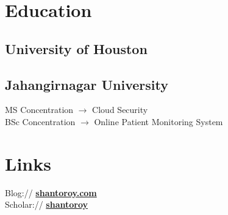 \documentclass[letterpaper,dvipsnames]{deedy-resume} %
\begin{document}
\begin{minipage}[t]{0.33\textwidth} %


\section{Education} 

\subsection{University of Houston}


\sectionspace %

\subsection{Jahangirnagar University}
MS Concentration $\rightarrow$ Cloud Security \\
BSc Concentration $\rightarrow$ Online Patient Monitoring System \\

\sectionspace %






\section{Links} 
Blog:// \href{https:shantoroy.com}{\bf shantoroy.com} \\
Scholar:// \href{https://scholar.google.com/citations?user=OMGYMbwAAAAJ&hl=en}{\bf shantoroy}\\


\end{minipage}
\end{document}

